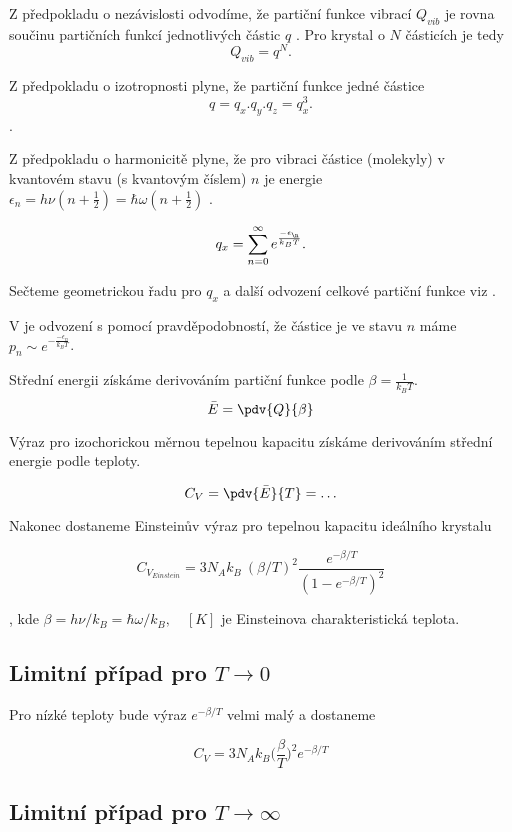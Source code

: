 Z předpokladu o nezávislosti odvodíme, že partiční funkce vibrací $Q_{vib}$ je rovna součinu partičních funkcí jednotlivých částic $q$ \cite{Malijevsky2009}. Pro krystal o $N$ částicích je tedy
$$
    Q_{vib} = q^N.
$$

Z předpokladu o izotropnosti plyne, že partiční funkce jedné částice 
$$
    q = q_x . q_y . q_z = q_x^3.
$$.

Z předpokladu o harmonicitě plyne, že pro vibraci částice (molekyly) v kvantovém stavu (s kvantovým číslem) $n$ je energie $ \epsilon_n = h \nu (n + \frac{1}{2}) = \hbar \omega (n  + \frac{1}{2})$ .

$$
q_x = \sum_{n = 0}^{\infty} e^{ \frac{-\epsilon_{\n}}{k_B T}}.
$$

Sečteme geometrickou řadu pro $q_x$ a další odvození celkové partiční funkce viz \cite{Malijevsky2009}.

V \cite{Danis2019} je odvození s pomocí pravděpodobností, že částice je ve stavu $n$ máme $p_n \sim e^{-\frac{-\epsilon_n}{k_B T}}$.


Střední energii získáme derivováním partiční funkce podle $\beta = \frac{1}{k_B T}$. 
$$
\bar E = \pdv{Q}{\beta}
$$

Výraz pro izochorickou měrnou tepelnou kapacitu získáme derivováním střední energie podle teploty.

$$
C_V = \pdv{\bar E}{T} = \ldots
$$

Nakonec dostaneme Einsteinův výraz pro tepelnou kapacitu ideálního krystalu

\begin{equation}
    C_V_{Einstein}  = 3 N_A k_B\ (\beta / T)^2 \frac{e^{-\beta/T}}{ (1-e^{-\beta/T})^2 }
\end{equation}

, kde $\beta = h\nu/k_B = \hbar \omega/k_B, \quad [K]$ je Einsteinova charakteristická teplota.

\subsection*{Limitní případ pro $T \to 0$}

Pro nízké teploty bude výraz $e^{-\beta/T}$ velmi malý a dostaneme

$$
    C_V = 3N_A k_B \Big(\frac{\beta}{T}\Big)^2 e^{-\beta/T}
$$

\subsection*{Limitní případ pro $T \to \infty$}
 
